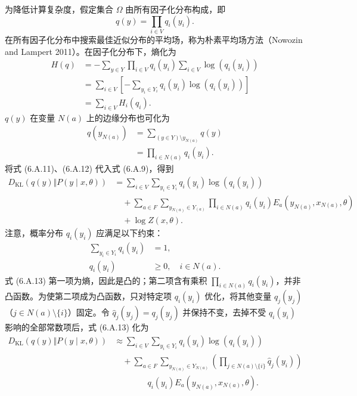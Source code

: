 为降低计算复杂度，假定集合 $\Omega$ 由所有因子化分布构成，即
\begin{equation}
q(y)=\prod_{i\in V}q_i(y_i).
\tag{6.A.10}
\end{equation}
在所有因子化分布中搜索最佳近似分布的平均场，称为朴素平均场方法（Nowozin and Lampert 2011）。在因子化分布下，熵化为
\begin{equation}
\begin{aligned}
H(q)&=-\sum_{y\in Y}\prod_{i\in V}q_i(y_i)\sum_{i\in V}\log(q_i(y_i))\\
&=\sum_{i\in V}\left[-\sum_{y_i\in Y_i}q_i(y_i)\log(q_i(y_i))\right]\\
&=\sum_{i\in V}H_i(q_i).
\end{aligned}\tag{6.A.11}
\end{equation}
$q(y)$ 在变量 $N(a)$ 上的边缘分布也可化为
\begin{equation}
\begin{aligned}
q(y_{N(a)})&=\sum_{(y\in Y)\setminus y_{N(a)}}q(y)\\
&=\prod_{i\in N(a)}q_i(y_i).
\end{aligned}\tag{6.A.12}
\end{equation}
将式 (6.A.11)、(6.A.12) 代入式 (6.A.9)，得到
\begin{equation}
\begin{aligned}
D_{\mathrm{KL}}(q(y)\Vert P(y\mid x,\theta))&=\sum_{i\in V}\sum_{y_i\in Y_i}q_i(y_i)\log(q_i(y_i))\\
&\quad+\sum_{a\in F}\sum_{y_{N(a)}\in Y_{(a)}}\prod_{i\in N(a)}q_i(y_i)E_a(y_{N(a)},x_{N(a)},\theta)\\
&\quad+\log Z(x,\theta).
\end{aligned}\tag{6.A.13}
\end{equation}
注意，概率分布 $q_i(y_i)$ 应满足以下约束：
\begin{equation}
\begin{aligned}
\sum_{y_i\in Y_i}q_i(y_i)&=1,\\
q_i(y_i)&\geq0,\quad i\in N(a).
\end{aligned}\tag{6.A.14}
\end{equation}
式 (6.A.13) 第一项为熵，因此是凸的；第二项含有乘积 $\prod_{i\in N(a)}q_i(y_i)$，并非凸函数。为使第二项成为凸函数，只对特定项 $q_i(y_i)$ 优化，将其他变量 $q_j(y_j)$（$j\in N(a)\setminus\{i\}$）固定。令 $\widehat q_j(y_j)=q_j(y_j)$ 并保持不变，去掉不受 $q_i(y_i)$ 影响的全部常数项后，式 (6.A.13) 化为
\begin{equation}
\begin{aligned}
D_{\mathrm{KL}}(q(y)\Vert P(y\mid x,\theta))&\approx\sum_{i\in V}\sum_{y_i\in Y_i}q_i(y_i)\log(q_i(y_i))\\
&\quad+\sum_{a\in F}\sum_{y_{N(a)}\in Y_{N(a)}}\left(\prod_{j\in N(a)\setminus\{i\}}\widehat q_j(y_i)\right)\\
&\qquad\qquad q_i(y_i)E_a(y_{N(a)},x_{N(a)},\theta).
\end{aligned}\tag{6.A.15}
\end{equation}
